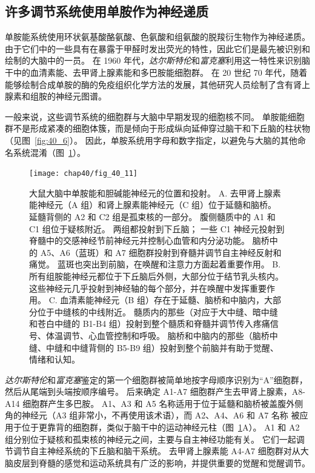 \subsection{许多调节系统使用单胺作为神经递质}

单胺能系统使用环状氨基酸酪氨酸、色氨酸和组氨酸的脱羧衍生物作为神经递质。
由于它们中的一些具有在暴露于甲醛时发出荧光的特性，因此它们是最先被识别和绘制的大脑中的一员。
在 1960 年代，\textit{达尔斯特伦}和\textit{富克塞}利用这一特性来识别脑干中的血清素能、去甲肾上腺素能和多巴胺能细胞群。
在 20 世纪 70 年代，随着能够绘制合成单胺的酶的免疫组织化学方法的发展，其他研究人员绘制了含有肾上腺素和组胺的神经元图谱。


一般来说，这些调节系统的细胞群与大脑中早期发现的细胞核不同。
单胺能细胞群不是形成紧凑的细胞体簇，而是倾向于形成纵向延伸穿过脑干和下丘脑的柱状物（见图~\ref{fig:40_6}）。
因此，单胺系统用字母和数字指定，以避免与大脑的其他命名系统混淆（图~\ref{fig:40_11}）。


\begin{figure}[htbp]
	\centering
	\texttt{[image: chap40/fig\_40\_11]}
	\caption{大鼠大脑中单胺能和胆碱能神经元的位置和投射。
		A. 去甲肾上腺素能神经元（A 组）和肾上腺素能神经元（C 组）位于延髓和脑桥。
		延髓背侧的 A2 和 C2 组是孤束核的一部分。
		腹侧髓质中的 A1 和 C1 组位于疑核附近。
		两组都投射到下丘脑；
		一些 C1 神经元投射到脊髓中的交感神经节前神经元并控制心血管和内分泌功能。
		脑桥中的 A5、A6（蓝斑）和 A7 细胞群投射到脊髓并调节自主神经反射和痛觉。
		蓝斑也突出到前脑，在唤醒和注意力方面起着重要作用。
		B. 所有组胺能神经元都位于下丘脑后外侧，大部分位于结节乳头核内。
		这些神经元几乎投射到神经轴的每个部分，并在唤醒中发挥重要作用。
		C. 血清素能神经元（B 组）存在于延髓、脑桥和中脑内，大部分位于中缝核的中线附近。
		髓质内的那些（对应于大中缝、暗中缝和苍白中缝的 B1-B4 组）投射到整个髓质和脊髓并调节传入疼痛信号、体温调节、心血管控制和呼吸。
		脑桥和中脑内的那些（脑桥中缝、中缝和中缝背侧的 B5-B9 组）投射到整个前脑并有助于觉醒、情绪和认知。}
	\label{fig:40_11}
\end{figure}


\textit{达尔斯特伦}和\textit{富克塞}鉴定的第一个细胞群被简单地按字母顺序识别为“A”细胞群，然后从尾端到头端按顺序编号。
后来确定 A1-A7 细胞群产生去甲肾上腺素，A8-A14 细胞群产生多巴胺。
A1、A3 和 A5 名称适用于位于延髓和脑桥被盖腹外侧角的神经元（A3 组非常小，不再使用该术语），而 A2、A4、A6 和 A7 名称 被应用于位于更靠背的细胞群，类似于脑干中的运动神经元柱（图~\ref{fig:40_11}A）。
A1 和 A2 组分别位于疑核和孤束核的神经元之间，主要与自主神经功能有关。
它们一起调节调节自主神经系统的下丘脑和脑干系统。
去甲肾上腺素能 A4-A7 细胞群对从大脑皮层到脊髓的感觉和运动系统具有广泛的影响，并提供重要的觉醒和觉醒调节。


